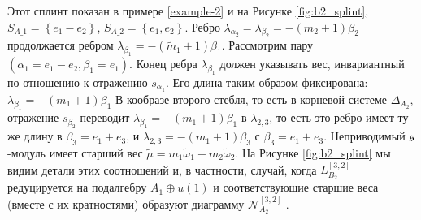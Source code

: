 \begin{itemize}
Этот сплинт показан в примере \ref{example-2} и на Рисунке \ref{fig:b2_splint}, 
$S_{A\_1}=\left\{ e_{1}-e_{2}\right\} $, $S_{A\_2}=\left\{e_{1},e_{2}\right\} $. Ребро $\lambda _{\alpha _{2}}=\lambda_{\beta _{2}}=-\left( m_{2}+1\right) \beta _{2}$ продолжается ребром $\lambda _{\beta _{1}}=-\left( \widetilde{m}_{1}+1\right) \beta_{1}$. Рассмотрим пару $\left(\alpha_{1}=e_{1}-e_{2},\beta _{1}=e_{1}\right)$. Конец ребра $\lambda _{\beta _{1}}$ должен указывать вес, инвариантный по отношению к отражению  $s_{\alpha _{1}}$. Его длина таким образом фиксирована: $\lambda _{\beta _{1}}=-\left( m_{1}+1\right) \beta _{1}$ В кообразе второго стебля, то есть в корневой системе $\Delta_{A_{2}}$, отражение $s_{\beta _{2}}$ переводит $\lambda _{\beta _{1}}=-\left(m_{1}+1\right) \beta_{1}$ в $\lambda _{2,3}$, то есть это ребро имеет ту же длину в $\beta _{3}=e_{1}+e_{3}$, и $\lambda _{2,3}=-\left(m_{1}+1\right)\beta _{3}$ с $\beta_{3}=e_{1}+e_{3}$. Неприводимый  $\mathfrak{s}$-модуль имеет старший вес $\widetilde{\mu }=m_{1}\widetilde{\omega }_{1}+m_{2}\widetilde{\omega }_{2}$. На Рисунке \ref{fig:b2_splint} мы видим детали этих соотношений и, в частности, случай, когда $L_{B_{2}}^{\left[ 3,2\right] }$ редуцируется на подалгебру $A_{1}\oplus u\left( 1\right) $ и соответствующие старшие веса (вместе с их кратностями) образуют диаграмму $\mathcal{N}_{A_2}^{\left[ 3,2\right] }$ .
\end{itemize}



